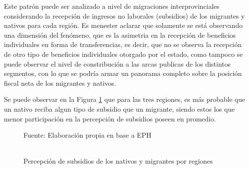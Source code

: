 \documentclass[12pt,a4paper]{article}
\begin{document}
Este patrón puede ser analizado a nivel de migraciones interprovinciales considerando la recepción de ingresos no laborales (subsidios) de los migrantes y nativos para cada región. Es menester aclarar que solamente se está observando una dimensión del fenómeno, que es la asimetria en la recepción de beneficios individuales en forma de transferencias, es decir, que no se observa la recepción de otro tipo de beneficios individuales otorgado por el estado, como tampoco se puede observar el nivel de constribución a las arcas publicas de los distintos segmentos, con lo que se podría armar un panorama completo sobre la posición fiscal neta de los migrantes y nativos.

Se puede observar en la Figura \ref{figure:subsidio_mig} que para las tres regiones, es más probable que un nativo reciba algun tipo de subsidio que un migrante, siendo estos los que menor participación en la percepción de subsidios poseen en promedio.

\begin{figure}[ht!]
\begin{center}
\caption{\\Percepción de subsidios de los nativos y migrantes por regiones}
\label{figure:subsidio_mig}
 
\end{center}
\begin{flushleft}
\begin{scriptsize}
Fuente: Elaboración propia en base a EPH
\end{scriptsize}
\end{flushleft}
\end{figure}
\end{document}
